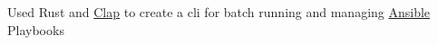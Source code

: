 {Used Rust and \href{https://docs.rs/clap/latest/clap/}{Clap} to create a cli for batch running and managing \href{https://www.ansible.com/}{Ansible} Playbooks}

